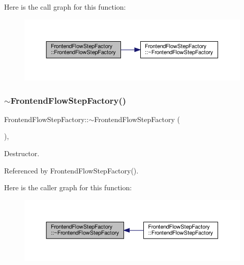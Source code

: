 Here is the call graph for this function\+:
\nopagebreak
\begin{figure}[H]
\begin{center}
\leavevmode
\includegraphics[width=350pt]{db/dd6/classFrontendFlowStepFactory_a78215963a4103afc850b8724e04164b9_cgraph}
\end{center}
\end{figure}
\mbox{\label{classFrontendFlowStepFactory_a4f65a248e1febbdf593ac04397a0100f}} 
\subsubsection{\texorpdfstring{$\sim$\+Frontend\+Flow\+Step\+Factory()}{~FrontendFlowStepFactory()}}
{\footnotesize\ttfamily Frontend\+Flow\+Step\+Factory\+::$\sim$\+Frontend\+Flow\+Step\+Factory (\begin{DoxyParamCaption}{ }\end{DoxyParamCaption})\hspace{0.3cm}{\ttfamily [override]}, {\ttfamily [default]}}



Destructor. 



Referenced by Frontend\+Flow\+Step\+Factory().

Here is the caller graph for this function\+:
\nopagebreak
\begin{figure}[H]
\begin{center}
\leavevmode
\includegraphics[width=350pt]{db/dd6/classFrontendFlowStepFactory_a4f65a248e1febbdf593ac04397a0100f_icgraph}
\end{center}
\end{figure}


